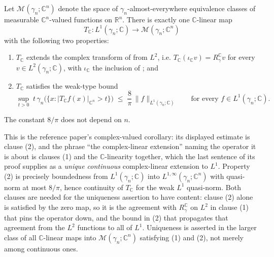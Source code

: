 \begin{corollary}
Let $\mathcal{M}(\gamma_n;\mathbb{C}^n)$ denote the space of
$\gamma_n$-almost-everywhere equivalence classes of measurable
$\mathbb{C}^n$-valued functions on $\mathbb{R}^n$.  There is exactly one
$\mathbb{C}$-linear map
\[
  T_{\mathbb{C}} : L^1(\gamma_n;\mathbb{C}) \longrightarrow
    \mathcal{M}(\gamma_n;\mathbb{C}^n)
\]
with the following two properties:
\begin{enumerate}
\item $T_{\mathbb{C}}$ extends the complex transform of
 from $L^2$, i.e.
$T_{\mathbb{C}}(\iota_{\mathbb{C}} v) = R_\gamma^{\mathbb{C}} v$ for every
$v \in L^2(\gamma_n;\mathbb{C})$, with $\iota_{\mathbb{C}}$ the inclusion of
; and
\item $T_{\mathbb{C}}$ satisfies the weak-type bound
\[
  \sup_{t>0}\; t\,\gamma_n\bigl(\{x :
    |T_{\mathbb{C}}f(x)|_{\mathbb{C}^n} > t\}\bigr)
    \;\leq\; \frac{8}{\pi}\,\|f\|_{L^1(\gamma_n;\mathbb{C})}
  \qquad\text{for every } f \in L^1(\gamma_n;\mathbb{C}) .
\]
\end{enumerate}
The constant $8/\pi$ does not depend on $n$.

This is the reference paper's complex-valued corollary: its displayed estimate
is clause (2), and the phrase ``the complex-linear extension'' naming the
operator it is about is clauses (1) and the $\mathbb{C}$-linearity together,
which the last sentence of its proof supplies as a \emph{unique continuous}
complex-linear extension to $L^1$.  Property (2) is precisely boundedness from
$L^1(\gamma_n;\mathbb{C})$ into $L^{1,\infty}(\gamma_n;\mathbb{C}^n)$ with
quasi-norm at most $8/\pi$, hence continuity of $T_{\mathbb{C}}$ for the weak
$L^1$ quasi-norm.  Both clauses are needed for the uniqueness assertion to have
content: clause (2) alone is satisfied by the zero map, so it is the agreement
with $R_\gamma^{\mathbb{C}}$ on $L^2$ in clause (1) that pins the operator down,
and the bound in (2) that propagates that agreement from the $L^2$ functions to
all of $L^1$.  Uniqueness is asserted in the larger class of all
$\mathbb{C}$-linear maps into $\mathcal{M}(\gamma_n;\mathbb{C}^n)$ satisfying (1)
and (2), not merely among continuous ones.
\end{corollary}
